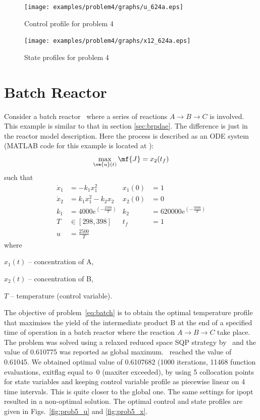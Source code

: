 \begin{figure}[htb]
\begin{minipage}[t]{0.5\linewidth}
\centering
\texttt{[image: examples/problem4/graphs/u\_624a.eps]}
\caption[Problem 4: Control profile]{Control profile for problem 4}
\label{fig:prob4_u}  
\end{minipage}
\begin{minipage}[t]{0.5\linewidth}
\centering
\texttt{[image: examples/problem4/graphs/x12\_624a.eps]}
\caption[Problem 4: State profiles]{State profiles for problem 4}
\label{fig:prob4_x} 
\end{minipage}
\end{figure}
 
\section{Batch Reactor}
\label{sec:prob5}

Consider a batch reactor~\citep{raj01,dad95} where a series of
reactions $A \rightarrow B\rightarrow C$ is involved. This example is
similar to that in section \ref{sec:brpdae}. The difference is just in
the reactor model description. Here the process is described as an ODE
system (MATLAB code for this example is located at
):
\begin{equation}
\max_{\ve{u}(t)} \mf{J} = x_{2}(t_{f}) \label{eq:batch}
\end{equation}
such that
\begin{align*}
\dot{x}_1&=-k_{1}x_{1}^{2} &x_1(0) &= 1 \\
\dot{x}_2&=k_{1}x_{1}^{2}-k_{2}x_{2} &x_2(0) &= 0 \\
k_1 &=4000e^{(-\frac{2500}{T})} &k_2 &=620000e^{(-\frac{5000}{T})} \\
T &\in [298,398] & t_f &=1 \\
u &= \frac{2500}{T}
\end{align*}
where
\begin{description}
\item $x_{1}(t)$ -- concentration of A,
\item $x_{2}(t)$ -- concentration of B,
\item $T$ -- temperature (control variable).
\end{description}

The objective of problem~\eqref{eq:batch} is to obtain the optimal
temperature profile that maximises the yield of the intermediate
product B at the end of a specified time of operation in a batch
reactor where the reaction $A \rightarrow B \rightarrow C$ take
place. The problem was solved using a relaxed reduced space SQP
strategy by~\cite{log89} and the value of 0.610775 was reported as
global maximum.~\citeauthor{raj01} reached the value of 0.61045. We
obtained optimal value of 0.6107682 (1000 iterations, 11468 function
evaluations, exitflag equal to~0 (maxiter exceeded), by using
5 collocation points for state variables and keeping control variable
profile as piecewise linear on 4 time intervals. This is quite closer
to the global one. The same settings for ipopt resulted in
a non-optimal solution. The optimal control
and state profiles are given in Figs.~\ref{fig:prob5_u} and
\ref{fig:prob5_x}.
  
